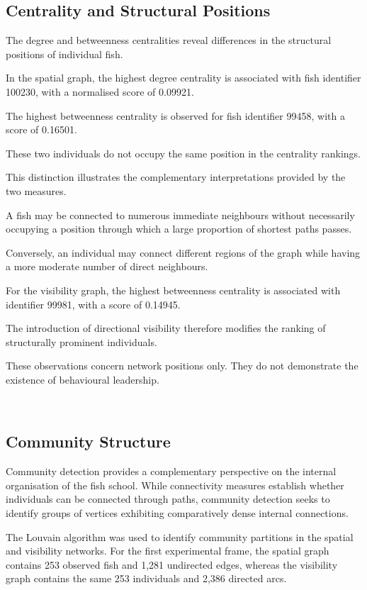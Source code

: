 \documentclass[10pt,a4paper]{article}
\begin{document}
\subsection{Centrality and Structural Positions}

The degree and betweenness centralities reveal
differences in the structural positions of
individual fish.

In the spatial graph, the highest degree
centrality is associated with fish identifier
100230, with a normalised score of 0.09921.

The highest betweenness centrality is observed
for fish identifier 99458, with a score
of 0.16501.

These two individuals do not occupy the same
position in the centrality rankings.

This distinction illustrates the complementary
interpretations provided by the two measures.

A fish may be connected to numerous immediate
neighbours without necessarily occupying a
position through which a large proportion of
shortest paths passes.

Conversely, an individual may connect different
regions of the graph while having a more
moderate number of direct neighbours.

For the visibility graph, the highest
betweenness centrality is associated with
identifier 99981, with a score of 0.14945.

The introduction of directional visibility
therefore modifies the ranking of structurally
prominent individuals.

These observations concern network positions
only. They do not demonstrate the existence
of behavioural leadership.

\
\subsection{Community Structure}
\label{subsec:community_structure}

Community detection provides a complementary perspective
on the internal organisation of the fish school. While
connectivity measures establish whether individuals can
be connected through paths, community detection seeks
to identify groups of vertices exhibiting comparatively
dense internal connections.

The Louvain algorithm was used to identify community
partitions in the spatial and visibility networks.
For the first experimental frame, the spatial graph
contains 253 observed fish and 1,281 undirected edges,
whereas the visibility graph contains the same
253 individuals and 2,386 directed arcs.
\end{document}
